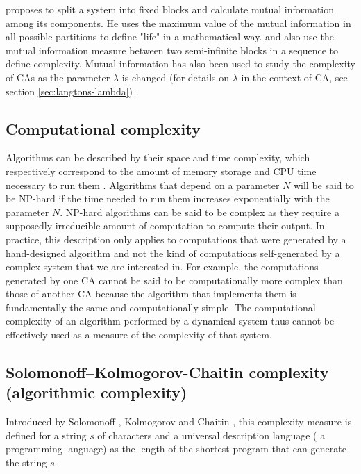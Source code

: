 \textcite{chaitinMathematicalDefinitionLife1987} proposes to split a system into
fixed blocks and calculate mutual information among its components.
He uses the maximum value of the mutual information in all possible partitions
to define "life" in a mathematical way. \textcite{shawDrippingFaucetModel1984}
and \textcite{grassbergerQuantitativeTheorySelfgenerated1986} also use the
mutual information measure between two semi-infinite blocks in a sequence to
define complexity. Mutual information has also been used to study the
complexity of \acp{CA} as the parameter $\lambda$ is changed (for details
on $\lambda$ in the context of \ac{CA}, see section \ref{sec:langtons-lambda})
\parencite{gutowitzMethodsDesigningCellular1988,
  liTransitionPhenomenaCellular1990}.


\subsection{Computational complexity}
Algorithms can be described by their space and time complexity, which
respectively correspond to the amount of memory storage and CPU time necessary
to run them \parencite{traubInformationUncertaintyComplexity1983,
  packelRecentDevelopmentsInformationbased1987,
  hopcroftIntroductionAutomataTheory2007}. Algorithms that depend on a parameter
$N$ will be said to be NP-hard if the time needed to run them increases
exponentially with the parameter $N$. NP-hard algorithms can be said to be
complex as they require a supposedly irreducible amount of computation to
compute their output. In practice, this description only applies to computations
that were generated by a hand-designed algorithm and not the kind of
computations self-generated by a complex system that we are interested in. For
example, the computations generated by one \ac{CA} cannot be said to be
computationally more complex than those of another \ac{CA} because the algorithm that
implements them is fundamentally the same and computationally simple. The
computational complexity of an algorithm performed by a dynamical system thus
cannot be effectively used as a measure of the complexity of that system.

\subsection{Solomonoff–Kolmogorov-Chaitin complexity (algorithmic
  complexity)}\label{sec:algo-complexity}

Introduced by Solomonoff \parencite{solomonoffPreliminaryReportGeneral1960},
Kolmogorov \parencite{kolmogorovThreeApproachesQuantitative1968} and Chaitin
\parencite{chaitinLengthProgramsComputing1969,
  chaitinAlgorithmicInformationTheory1977,
  chaitinInformationRandomnessIncompleteness1990}, this complexity measure is
defined for a string $s$ of characters and a universal description language (\eg
a programming language) as the length of the shortest program that can generate
the string $s$.

